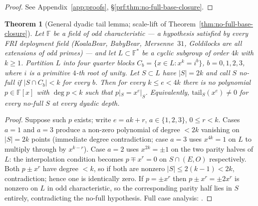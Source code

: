 \documentclass[11pt]{article}
\newtheorem{theorem}{Theorem}[section]
\theoremstyle{definition}
\theoremstyle{remark}
\begin{document}
\begin{proof}[Proof] See Appendix~\ref{app:proofs}, \S\ref{prf:thm:no-full-base-closure}.\end{proof}

\begin{theorem}[General dyadic tail lemma; scale-lift of
Theorem~\ref{thm:no-full-base-closure}]
\label{thm:dyadic-tail-scale-lift}
Let $\mathbb{F}$ be a field of odd characteristic --- a hypothesis
satisfied by every FRI deployment field
(KoalaBear, BabyBear, Mersenne~$31$, Goldilocks are all extensions
of odd primes) --- and let $L \subset \mathbb{F}^*$ be a cyclic
subgroup of order $4k$ with $k \geq 1$. Partition $L$ into four quarter blocks $C_b = \{x \in L
: x^k = i^b\}$, $b = 0, 1, 2, 3$, where $i$ is a primitive $4$-th
root of unity. Let $S \subset L$ have $|S| = 2k$ and call $S$
\emph{no-full} if $|S \cap C_b| < k$ for every $b$. Then for every
$k \leq e < 4k$ there is no polynomial $p \in \mathbb{F}[x]$ with
$\deg p < k$ such that $p|_S = x^e|_S$. Equivalently,
$\mathrm{tail}_S(x^e) \neq 0$ for every no-full $S$ at every dyadic
depth.
\end{theorem}

\begin{proof}[Proof]
Suppose such $p$ exists; write $e = a k + r$, $a \in \{1, 2, 3\}$,
$0 \leq r < k$. Cases $a = 1$ and $a = 3$ produce a non-zero polynomial
of degree $< 2k$ vanishing on $|S| = 2k$ points (immediate degree
contradiction; case $a = 3$ uses $x^{4k} = 1$ on $L$ to multiply
through by $x^{k-r}$). Case $a = 2$ uses $x^{2k} = \pm 1$ on the
two parity halves of $L$: the interpolation condition becomes
$p \mp x^r = 0$ on $S \cap (E, O)$ respectively. Both $p \pm x^r$
have degree $< k$, so if both are nonzero $|S| \leq 2(k - 1) < 2k$,
contradiction; hence one is identically zero. If $p = \pm x^r$ then
$p \pm x^r = \pm 2 x^r$ is nonzero on $L$ in odd characteristic,
so the corresponding parity half lies in $S$ entirely, contradicting
the no-full hypothesis. Full case analysis: \cite{CompanionRepo}
\cite{CompanionRepo}.
\end{proof}
\end{document}
